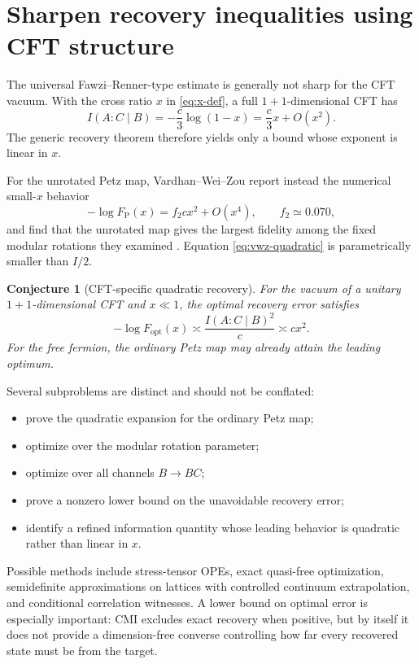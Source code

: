 \documentclass[11pt]{article}
\theoremstyle{accenttheorem}
\newtheorem{conjecture}{Conjecture}
\theoremstyle{definition}
\newcommand{\CMI}{I}
\newcommand{\1}{\mathbf{1}}
\begin{document}
\section{Sharpen recovery inequalities using CFT structure}

The universal Fawzi--Renner-type estimate is generally not sharp for the CFT vacuum.  With the cross ratio \(x\) in \eqref{eq:x-def}, a full \(1+1\)-dimensional CFT has
\begin{equation}\label{eq:cmi-small-x}
 \CMI(A:C\mid B)
 =-\frac{c}{3}\log(1-x)
 =\frac{c}{3}x+O(x^2).
\end{equation}
The generic recovery theorem therefore yields only a bound whose exponent is linear in \(x\).

For the unrotated Petz map, Vardhan--Wei--Zou report instead the numerical small-\(x\) behavior
\begin{equation}\label{eq:vwz-quadratic}
 -\log F_{\mathrm P}(x)
 =f_2 c x^2+O(x^4),
 \qquad f_2\simeq0.070,
\end{equation}
and find that the unrotated map gives the largest fidelity among the fixed modular rotations they examined \cite{VardhanWeiZou}.  Equation \eqref{eq:vwz-quadratic} is parametrically smaller than \(\CMI/2\).

\begin{conjecture}[CFT-specific quadratic recovery]
For the vacuum of a unitary \(1+1\)-dimensional CFT and \(x\ll1\), the optimal recovery error satisfies
\[
 -\log F_{\mathrm{opt}}(x)
 \asymp \frac{\CMI(A:C\mid B)^2}{c}
 \asymp c x^2.
\]
For the free fermion, the ordinary Petz map may already attain the leading optimum.
\end{conjecture}

Several subproblems are distinct and should not be conflated:

\begin{itemize}
\item prove the quadratic expansion for the ordinary Petz map;
\item optimize over the modular rotation parameter;
\item optimize over all channels \(B\to BC\);
\item prove a nonzero lower bound on the unavoidable recovery error;
\item identify a refined information quantity whose leading behavior is quadratic rather than linear in \(x\).
\end{itemize}

Possible methods include stress-tensor OPEs, exact quasi-free optimization, semidefinite approximations on lattices with controlled continuum extrapolation, and conditional correlation witnesses.  A lower bound on optimal error is especially important: CMI excludes exact recovery when positive, but by itself it does not provide a dimension-free converse controlling how far every recovered state must be from the target.
\end{document}
